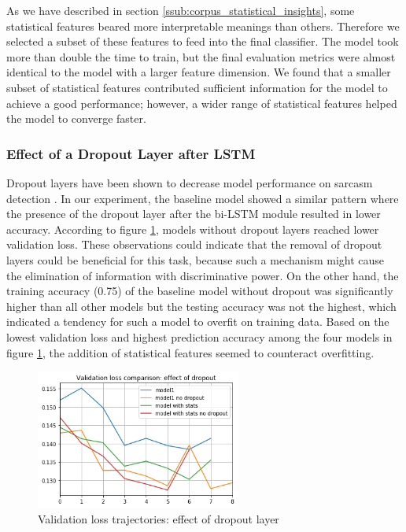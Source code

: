\documentclass[12pt]{diazessay} %
\begin{document}
As we have described in section \ref{ssub:corpus_statistical_insights}, some statistical features beared more interpretable meanings than others. Therefore we selected a subset of these features to feed into the final classifier. The model took more than double the time to train, but the final evaluation metrics were almost identical to the model with a larger feature dimension. We found that a smaller subset of statistical features contributed sufficient information for the model to achieve a good performance; however, a wider range of statistical features helped the model to converge faster. 

\subsubsection{Effect of a Dropout Layer after LSTM} %
\label{ssub:effect_of_a_dropout_layer_after_lstm}


Dropout layers have been shown to decrease model performance on sarcasm detection \citep{ghosh2016}. In our experiment, the baseline model showed a similar pattern where the presence of the dropout layer after the bi-LSTM module resulted in lower accuracy. According to figure \ref{figure:dropout}, models without dropout layers reached lower validation loss. These observations could indicate that the removal of dropout layers could be beneficial for this task, because such a mechanism might cause the elimination of information with discriminative power. On the other hand, the training accuracy (0.75) of the baseline model without dropout was significantly higher than all other models but the testing accuracy was not the highest, which indicated a tendency for such a model to overfit on training data. Based on the lowest validation loss and highest prediction accuracy among the four models in figure \ref{figure:dropout}, the addition of statistical features seemed to counteract overfitting. 

\begin{figure}[h!]
    \centering
    \includegraphics[width=0.6\textwidth]{graphs/loss_plots/dropout.png}
    \caption{Validation loss trajectories: effect of dropout layer}
    \label{figure:dropout}
\end{figure}
\end{document}
